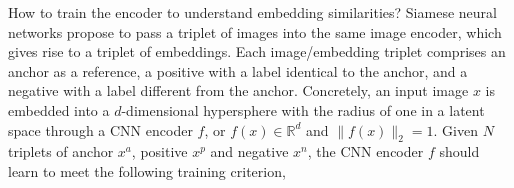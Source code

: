 \begin{table}
\caption{Our neural network architecture of the image encoder.  {\color{red}
This whole table can be replaced by an illustrative figure.}}
\label{table:nn_arch}
\end{table}

How to train the encoder to understand embedding similarities?  Siamese neural
networks propose to pass a triplet of images into the same image encoder, which
gives rise to a triplet of embeddings.  Each image/embedding triplet comprises
an anchor as a reference, a positive with a label identical to the anchor, and a
negative with a label different from the anchor.  Concretely, an
input image $x$ is embedded into a $d$-dimensional hypersphere with the radius
of one in a latent space through a CNN encoder $f$, or $f(x) \in \mathbb{R}^d$
and $\|f(x)\|_2=1$.  Given $N$ triplets of anchor $x^a$, positive $x^p$ and
negative $x^n$, the CNN encoder $f$ should learn to meet the following training
criterion,

